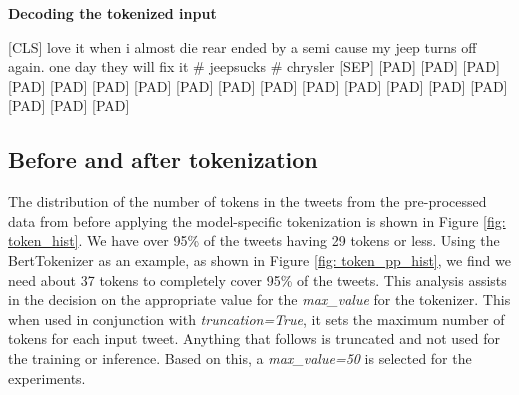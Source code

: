 \textbf{Decoding the tokenized input}\newline

\begin{adjustbox}{minipage={\textwidth},fbox}
    [CLS] love it when i almost die rear ended by a semi cause my jeep turns off again. one day they will fix it \# jeepsucks \# chrysler [SEP] [PAD] [PAD] [PAD] [PAD] [PAD] [PAD] [PAD] [PAD] [PAD] [PAD] [PAD] [PAD] [PAD] [PAD] [PAD] [PAD] [PAD] [PAD]
\end{adjustbox} \newline\newline

\subsection{Before and after tokenization}
The distribution of the number of tokens in the tweets from the pre-processed data from \cite{jinModelingSeverityComplaints2021} before applying the model-specific tokenization is shown in Figure \ref{fig: token_hist}. We have over 95\% of the tweets having 29 tokens or less. Using the BertTokenizer as an example, as shown in Figure \ref{fig: token_pp_hist}, we find we need about 37 tokens to completely cover 95\% of the tweets. This analysis assists in the decision on the appropriate value for the \textit{max\_value} for the tokenizer. This when used in conjunction with \textit{truncation=True}, it sets the maximum number of tokens for each input tweet. Anything that follows is truncated and not used for the training or inference. Based on this, a \textit{max\_value=50} is selected for the experiments. 

